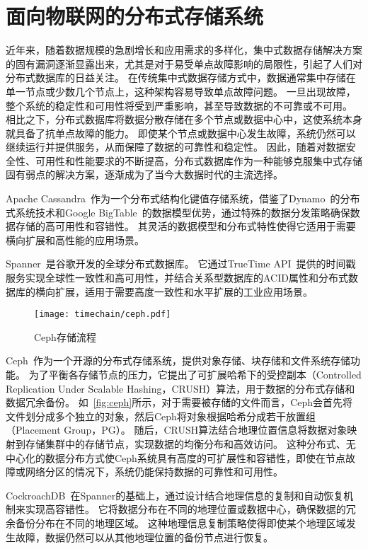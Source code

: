 \section{面向物联网的分布式存储系统}
近年来，随着数据规模的急剧增长和应用需求的多样化，集中式数据存储解决方案的固有漏洞逐渐显露出来，尤其是对于易受单点故障影响的局限性，引起了人们对分布式数据库的日益关注。
在传统集中式数据存储方式中，数据通常集中存储在单一节点或少数几个节点上，这种架构容易导致单点故障问题。
一旦出现故障，整个系统的稳定性和可用性将受到严重影响，甚至导致数据的不可靠或不可用。
相比之下，分布式数据库将数据分散存储在多个节点或数据中心中，这使系统本身就具备了抗单点故障的能力。
即使某个节点或数据中心发生故障，系统仍然可以继续运行并提供服务，从而保障了数据的可靠性和稳定性。
因此，随着对数据安全性、可用性和性能要求的不断提高，分布式数据库作为一种能够克服集中式存储固有弱点的解决方案，逐渐成为了当今大数据时代的主流选择。

Apache Cassandra~\cite{lakshman2010cassandra}作为一个分布式结构化键值存储系统，借鉴了Dynamo~\cite{decandia2007dynamo}的分布式系统技术和Google BigTable~\cite{chang2008bigtable}的数据模型优势，通过特殊的数据分发策略确保数据存储的高可用性和容错性。
其灵活的数据模型和分布式特性使得它适用于需要横向扩展和高性能的应用场景。

Spanner~\cite{corbett2013spanner}是谷歌开发的全球分布式数据库。
它通过TrueTime API~\cite{cervin2016truetime}提供的时间戳服务实现全球性一致性和高可用性，并结合关系型数据库的ACID属性和分布式数据库的横向扩展，适用于需要高度一致性和水平扩展的工业应用场景。

\begin{figure}[t]
    \centering
    \texttt{[image: timechain/ceph.pdf]}
    \caption{Ceph存储流程}
    \label{fig:ceph}
\end{figure}

Ceph~\cite{weil2006ceph}作为一个开源的分布式存储系统，提供对象存储、块存储和文件系统存储功能。
为了平衡各存储节点的压力，它提出了可扩展哈希下的受控副本（Controlled Replication Under Scalable Hashing，CRUSH）算法，用于数据的分布式存储和数据冗余备份。
如~\autoref{fig:ceph}所示，对于需要被存储的文件而言，Ceph会首先将文件划分成多个独立的对象，然后Ceph将对象根据哈希分成若干放置组（Placement Group，PG）。
随后，CRUSH算法结合地理位置信息将数据对象映射到存储集群中的存储节点，实现数据的均衡分布和高效访问。
这种分布式、无中心化的数据分布方式使Ceph系统具有高度的可扩展性和容错性，即使在节点故障或网络分区的情况下，系统仍能保持数据的可靠性和可用性。

CockroachDB~\cite{taft2020cockroachdb}在Spanner的基础上，通过设计结合地理信息的复制和自动恢复机制来实现高容错性。
它将数据分布在不同的地理位置或数据中心，确保数据的冗余备份分布在不同的地理区域。
这种地理信息复制策略使得即使某个地理区域发生故障，数据仍然可以从其他地理位置的备份节点进行恢复。

